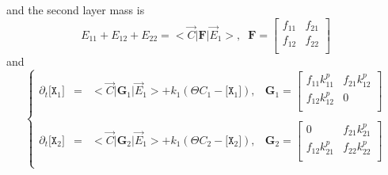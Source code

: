 \documentclass[aps,onecolumn,11pt]{revtex4}
\newcommand{\mychem}[1]{\mathtt{#1}}
\newcommand{\myconc}[1]{\big[#1\big]}
\newcommand{\spx}{\mychem{X}}
\newcommand{\mymat}[1]{{\bm{#1}}}
\begin{document}
and the second layer mass is
\begin{equation}
E_{11} + E_{12} + E_{22} = <{\vec{C}} \vert \mymat{F} \vert \vec{E}_1 >, \;\;
 \mymat{F} 
 = \begin{bmatrix}
	f_{11} & f_{21}\\
	f_{12} & f_{22}\\
\end{bmatrix}
\end{equation}
and
\begin{equation}
\left\lbrace
\begin{array}{rcll}
	\partial_t \myconc{\spx_1} & = & <\vec{C}|\mymat{G}_1|\vec{E}_1> + k_1\left(\Theta C_1 - \myconc{\spx_1}\right), &
	\mymat{G}_1 = 
	\begin{bmatrix}
	f_{11}k^p_{11} & f_{21} k^p_{12} \\
	f_{12}k^p_{12} & 0 \\
	\end{bmatrix}
	\\
	\\
	\partial_t \myconc{\spx_2} & = & <\vec{C}|\mymat{G}_2|\vec{E}_1> + k_1\left(\Theta C_2 - \myconc{\spx_2}\right), &
	\mymat{G}_2 = 
	\begin{bmatrix}
	0              & f_{21} k^p_{21}\\
	f_{12}k^p_{21} & f_{22}k^p_{22}\\
	\end{bmatrix}
	\\
\end{array}
\right.
\end{equation}
\end{document}
